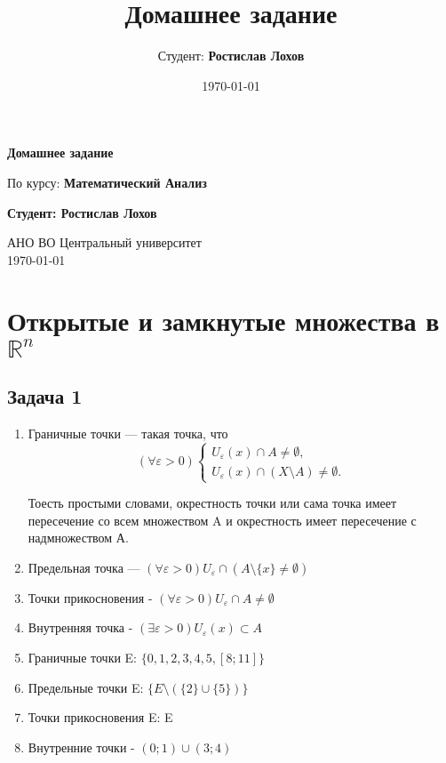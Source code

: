 \documentclass[a4paper,12pt]{article}
\title{Домашнее задание}
\author{Студент: \textbf{Ростислав Лохов}}
\date{\today}
\begin{document}
\begin{titlepage}
    \centering
    \vspace*{1cm}

    \Huge
    \textbf{Домашнее задание}

    \vspace{0.5cm}
    \LARGE
    По курсу: \textbf{Математический Анализ}

    \vspace{1.5cm}

    \textbf{Студент: Ростислав Лохов}

    \vfill

    \Large
    АНО ВО Центральный университет\\
    \vspace{0.3cm}
    \today

\end{titlepage}

\tableofcontents
\newpage

\section{Открытые и замкнутые множества в $\mathbb{R}^n$}

\subsection{Задача 1}

\begin{enumerate}
    \item Граничные точки — такая точка, что 
    \[
    (\forall \varepsilon > 0) 
    \begin{cases}
        U_{\varepsilon}(x) \cap A \ne \emptyset, \\ 
        U_{\varepsilon}(x) \cap (X\setminus A) \ne \emptyset.
    \end{cases}
    \]
    
    Тоесть простыми словами, окрестность точки или сама точка имеет пересечение со всем множеством A и окрестность имеет пересечение с надмножеством А.
    
    
    \item Предельная точка — $(\forall \varepsilon > 0) U_{\varepsilon} \cap (A \setminus \{x\} \ne \emptyset)$
    
    \item Точки прикосновения - $(\forall \varepsilon > 0) U_{\varepsilon} \cap A \ne \emptyset$
    
    \item Внутренняя точка - $(\exists \varepsilon > 0) U_{\varepsilon}(x) \subset A$
    
    \item Граничные точки E: $\{0, 1, 2, 3, 4, 5, [8;11]\}$
    \item Предельные точки E: $\{E \setminus (\{2\} \cup \{5\}) \}$
    \item Точки прикосновения E:  E
    \item Внутренние точки - $(0;1) \cup (3;4)$
\end{enumerate}
\end{document}
